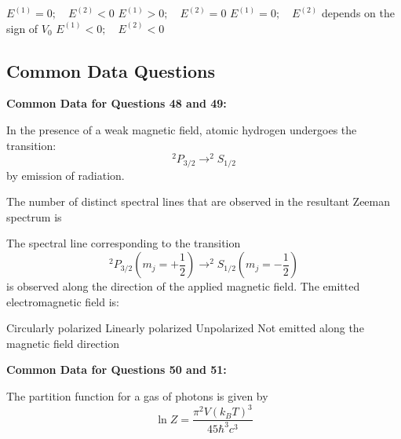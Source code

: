 \documentclass{exam}
\begin{document}
\begin{questions}
\begin{choices}
	\begin{multicols}{2}
	 \choice $E^{(1)}=0; \quad E^{(2)}<0$ \choice $E^{(1)}>0; \quad E^{(2)}=0$
	\choice $E^{(1)}=0; \quad E^{(2)}$ depends on the sign of $V_0$ \choice $E^{(1)}<0; \quad E^{(2)}<0$
	\end{multicols}
\end{choices}

\subsection*{Common Data Questions}
\textbf{Common Data for Questions 48 and 49:}
\par\noindent In the presence of a weak magnetic field, atomic hydrogen undergoes the transition:
\[ ^2P_{3/2} \rightarrow ^2S_{1/2} \]
by emission of radiation.

\question The number of distinct spectral lines that are observed in the resultant Zeeman spectrum is\par\hfill{}

\begin{oneparchoices}
	   
\end{oneparchoices}

\question The spectral line corresponding to the transition $$^2P_{3/2} \left(m_j = +\frac{1}{2}\right) \rightarrow ^2S_{1/2} \left(m_j = -\frac{1}{2}\right)$$ is observed along the direction of the applied magnetic field. The emitted electromagnetic field is:\hfill{}

\begin{choices}
	\begin{multicols}{2}
	 \choice Circularly polarized \choice Linearly polarized \choice Unpolarized \choice Not emitted along the magnetic field direction
	\end{multicols}
\end{choices}

\textbf{Common Data for Questions 50 and 51:}
\par\noindent The partition function for a gas of photons is given by
\[ \ln Z = \frac{\pi^2 V(k_B T)^3}{45 \hbar^3 c^3} \]


\end{questions}
\end{document}

